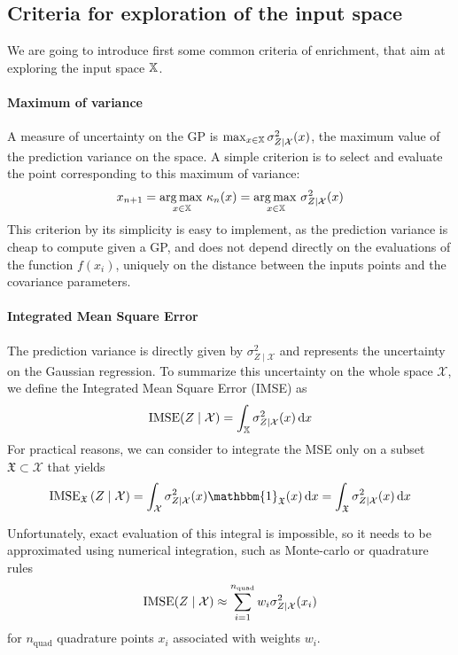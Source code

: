 \documentclass[../../Main_ManuscritThese.tex]{subfiles}
\begin{document}
\subsection{Criteria for exploration of the input space}
\label{sec:exploration_criteria}
We are going to introduce first some common criteria of enrichment, that aim at exploring the input space $\mathbb{X}$.

\paragraph{Maximum of variance}
A measure of uncertainty on the GP is $\max_{x\in\mathbb{X}} \sigma_{Z \mid \mathcal{X}}^2(x)$, the maximum value of the prediction variance on the space.
A simple criterion is to select and evaluate the point corresponding to this maximum of variance:
\begin{equation}
  x_{n+1} = \operatorname*{arg\,max \,}_{x\in \mathbb{X}} \kappa_n(x) = \operatorname*{arg\,max \,}_{x \in \mathbb{X}} \sigma^2_{Z \mid \mathcal{X}}(x)
\end{equation}
This criterion by its simplicity is easy to implement, as the prediction variance is cheap to compute given a GP, and does not depend directly on the evaluations of the function $f(x_i)$, uniquely on the distance between the inputs points and the covariance parameters.

\paragraph{Integrated Mean Square Error}
The prediction variance is directly given by $\sigma^2_{Z\mid \mathcal{X}}$ and represents the uncertainty on the Gaussian regression. To summarize this uncertainty on the whole space $\mathcal{X}$, we define the Integrated Mean Square Error (IMSE)\cite{sacks_designs_1989}
 as
\begin{equation}
  \operatorname{\mathrm{IMSE}}(Z \mid \mathcal{X}) = \int_{\mathbb{X}} \sigma_{Z\mid\mathcal{X}}^2(x)\,\mathrm{d}x
\end{equation}
For practical reasons, we can consider to integrate the MSE only on a subset $\mathfrak{X}\subset \mathcal{X}$ that yields
\begin{equation}
  \IMSE_{\mathfrak{X}}\left(Z \mid \mathcal{X} \right) = \int_{\mathcal{X}} \sigma^2_{Z\mid \mathcal{X}}(x)  \mathbbm{1}_{\mathfrak{X}}(x)\,\mathrm{d}x = \int_{\mathfrak{X}} \sigma^2_{Z\mid \mathcal{X}}(x)\,\mathrm{d}x
\end{equation}

Unfortunately, exact evaluation of this integral is impossible, so it needs to be approximated using numerical integration, such as Monte-carlo or quadrature rules
\begin{equation}
  \operatorname{\mathrm{IMSE}}(Z\mid \mathcal{X}) \approx \sum_{i=1}^{n_{\mathrm{quad}}} w_i \sigma^2_{Z\mid\mathcal{X}}(x_i)
\end{equation}
for $n_{\mathrm{quad}}$ quadrature points $x_i$ associated with weights $w_i$.
\end{document}
